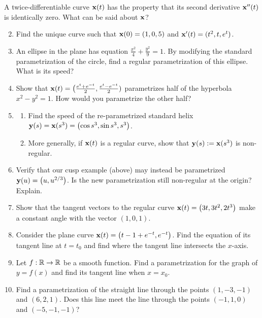 \begin{exercises}
\exstart A twice-differentiable curve ${\mathbf{x}}(t)$ has the property that its second derivative ${\mathbf{x}}''(t)$ is identically zero. What can be said about ${\mathbf{x}}$?
\begin{enumerate}\setcounter{enumi}{1}  
	\item Find the unique curve such that ${\mathbf{x}}(0)=(1,0,5)$ and ${\mathbf{x}}'(t)=(t^2,t,e^t)$.
	
	\item An ellipse in the plane has equation $\frac{x^2}4+\frac{y^2}9=1$. By modifying the standard parametrization of the circle, find a regular parametrization of this ellipse. What is its speed?
	
	\item Show that ${\mathbf{x}}(t)=\bigl(\frac{e^t+e^{-t}}2,\frac{e^{t}-e^{-t}}2)$ parametrizes half of the hyperbola $x^2-y^2=1$. How would you parametrize the other half?
	
  \item\label{exs:regnonintrinsic}\begin{enumerate}
    \item Find the speed of the re-parametrized standard helix ${\mathbf{y}}(s)={\mathbf{x}}(s^3)=\bigl(\cos s^3,\sin s^3,s^3\bigr)$.
    \item More generally, if ${\mathbf{x}}(t)$ is a regular curve, show that ${\mathbf{y}}(s):={\mathbf{x}}(s^3)$ is non-regular. 
  \end{enumerate}
  
	\item Verify that our cusp example (above) may instead be parametrized ${\mathbf{y}}(u)=\bigl(u,u^{2/3}\bigr)$. Is the new parametrization still non-regular at the origin? Explain.
	
	\item Show that the tangent vectors to the regular curve ${\mathbf{x}}(t)=\bigl(3t,3t^2,2t^3\bigr)$ make a constant angle with the vector $(1,0,1)$.
	
	\item Consider the plane curve ${\mathbf{x}}(t)=\bigl(t-1+e^{-t}, e^{-t}\bigr)$. Find the equation of its tangent line at $t=t_0$ and find where the tangent line intersects the $x$-axis.

	\item\label{exs:graphparam} Let $f:\mathbb{R}\to\mathbb{R}$ be a smooth function. Find a parametrization for the graph of $y=f(x)$ and find its tangent line when $x=x_0$.

	\item Find a parametrization of the straight line through the points $(1,-3,-1)$ and $(6,2,1)$. Does this line meet the line through the points $(-1,1,0)$ and $(-5,-1,-1)$?
\end{enumerate}
\end{exercises}

